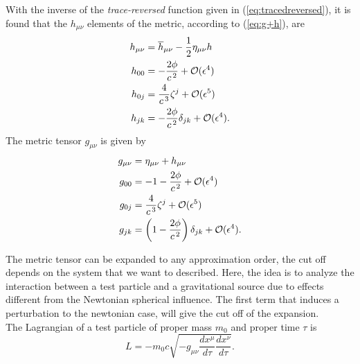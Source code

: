 With the inverse of the \textit{trace-reversed} function given in (\ref{eq:tracedreversed}), it is found that the $h_{\mu \nu}$ elements of the metric, according to (\ref{eq:g+h}), are
\begin{subequations}
\begin{align}
			h_{\mu \nu} &= \overline{h}_{\mu \nu} - \frac{1}{2}\eta_{\mu\nu}h\\
 			h_{00} &= -\frac{2\phi}{c^{\hspace{0.05cm}2}} + \mathcal{O}(\epsilon^4) \\
 			h_{0j} &= \frac{4}{c^{\hspace{0.05cm}3}}\zeta^j + \mathcal{O}(\epsilon^5) \\
  			h_{jk} &= -\frac{2\phi}{c^{\hspace{0.05cm}2}}\delta _{jk} + \mathcal{O}(\epsilon^4).
	\end{align}
\end{subequations}
The metric tensor $g_{\mu \nu}$ is given by
\begin{subequations}
	\begin{align} \label{eq:metrictensorsecondorder}
			g_{\mu\nu} &= \eta_{\mu\nu}+h_{\mu \nu}\\
 			g_{00} &= -1-\frac{2\phi}{c^{\hspace{0.05cm}2}} + \mathcal{O}(\epsilon^4) \\
 			g_{0j} &= \frac{4}{c^{\hspace{0.05cm}3}}\zeta^j + \mathcal{O}(\epsilon^5) \\
  			g_{jk} &= \left(1-\frac{2\phi}{c^{\hspace{0.05cm}2}}\right) \delta _{jk} + \mathcal{O}(\epsilon^4). 
	\end{align}
\end{subequations}

The metric tensor can be expanded to any approximation order, the cut off depends on the system that we want to described. Here, the idea is to analyze the interaction between a test particle and a gravitational source due to effects different from the Newtonian spherical influence. The first term that induces a perturbation to the newtonian case, will give the cut off of the expansion.\\

The Lagrangian of a test particle of proper mass $m_0$ and proper time $\tau$ is
\begin{equation}
L = -m_0c\sqrt{-g_{\mu\nu}\frac{dx^{\mu}}{d\tau}\frac{dx^{\nu}}{d\tau}}.
\end{equation}

